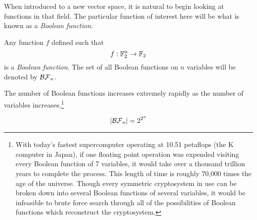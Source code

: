 \par When introduced to a new vector space, it is natural to begin looking
at functions in that field. The particular function of interest here will
be what is known as a {\em Boolean function}.

\begin{definition}
\label{def:boolean-function}
  Any function $f$ defined such that 
  \begin{equation*}
    f:\mathbb{F}_2^n\rightarrow\mathbb{F}_2
  \end{equation*}
  is a {\em Boolean function}. The set of all Boolean functions on $n$
  variables will be denoted by $\mathcal{BF}_n$.
\end{definition}

\par The number of Boolean functions increases extremely rapidly as the
number of variables increases.\footnote{With today's fastest supercomputer
operating at 10.51 petaflops (the K computer in Japan), if one floating
point operation was expended visiting every Boolean function of 7 variables,
it would take over a thousand trillion years to complete the process. This
length of time is roughly 70,000 times the age of the universe. Though
every symmetric cryptosystem in use can be broken down into several Boolean
functions of several variables, it would be infeasible to brute force search
through all of the possibilities of Boolean functions which reconstruct the
cryptosystem.}

\begin{equation}
  \lvert\mathcal{BF}_n\rvert = 2^{2^n}
\end{equation}

